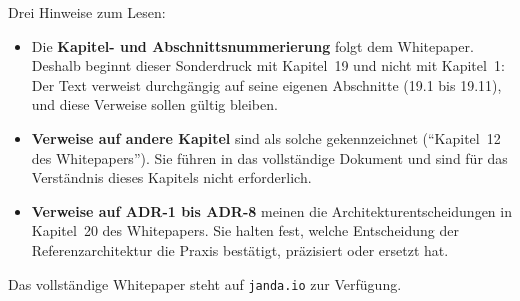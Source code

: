 \documentclass[11pt,a4paper,ngerman]{scrreprt}
\begin{document}
Drei Hinweise zum Lesen:

\begin{itemize}
  \item Die \textbf{Kapitel- und Abschnittsnummerierung} folgt dem
    Whitepaper. Deshalb beginnt dieser Sonderdruck mit Kapitel~19 und nicht
    mit Kapitel~1: Der Text verweist durchgängig auf seine eigenen
    Abschnitte (19.1 bis 19.11), und diese Verweise sollen gültig bleiben.
  \item \textbf{Verweise auf andere Kapitel} sind als solche gekennzeichnet
    (\enquote{Kapitel~12 des Whitepapers}). Sie führen in das vollständige
    Dokument und sind für das Verständnis dieses Kapitels nicht
    erforderlich.
  \item \textbf{Verweise auf ADR-1 bis ADR-8} meinen die
    Architekturentscheidungen in Kapitel~20 des Whitepapers. Sie halten
    fest, welche Entscheidung der Referenzarchitektur die Praxis bestätigt,
    präzisiert oder ersetzt hat.
\end{itemize}

Das vollständige Whitepaper steht auf \texttt{janda.io} zur Verfügung.

\setcounter{chapter}{18}


\printbibliography[heading=bibintoc,title={Literatur}]
\end{document}
